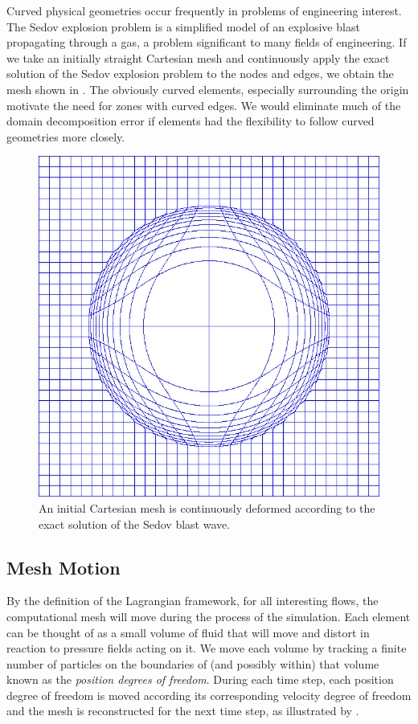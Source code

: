 Curved physical geometries occur frequently in problems of engineering interest. The Sedov explosion problem is a simplified model of an explosive blast propagating through a gas, a problem significant to many fields of engineering. If we take an initially straight Cartesian mesh and continuously apply the exact solution of the Sedov explosion problem to the nodes and edges, we obtain the mesh shown in . The obviously curved elements, especially surrounding the origin motivate the need for zones with curved edges. We would eliminate much of the domain decomposition error if elements had the flexibility to follow curved geometries more closely.

\begin{figure}[h!]
 \centering
 \includegraphics[width=5in,keepaspectratio=true]{./Figures/sedovCart.png}
 \caption{An initial Cartesian mesh is continuously deformed according to the exact solution of the Sedov blast wave.}
 \label{fig:ExactSedovMesh}
\end{figure}

\subsection{Mesh Motion}
By the definition of the Lagrangian framework, for all interesting flows, the computational mesh will move during the process of the simulation. Each element can be thought of as a small volume of fluid that will move and distort in reaction to pressure fields acting on it. We move each volume by tracking a finite number of particles on the boundaries of (and possibly within) that volume known as the \emph{position degrees of freedom}. During each time step, each position degree of freedom is moved according its corresponding velocity degree of freedom and the mesh is reconstructed for the next time step, as illustrated by .

